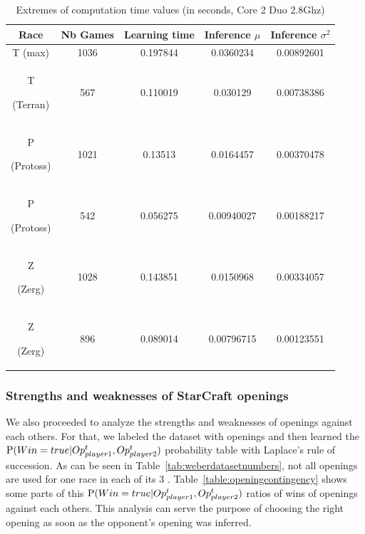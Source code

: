 \begin{table}[h]
\caption{Extremes of computation time values (in seconds, Core 2 Duo 2.8Ghz)}
\begin{center}
\begin{tabular}{|c|cc|cc|}
\hline
Race
& Nb Games
& Learning time
& Inference $\mu$
& Inference $\sigma^2$ \\ \hline
T (max) & 1036 & 0.197844 & 0.0360234 & 0.00892601 \\
T \begin{tiny}(Terran)\end{tiny} & 567 & 0.110019 & 0.030129 & 0.00738386 \\ 
P \begin{tiny}(Protoss)\end{tiny} & 1021 & 0.13513 & 0.0164457 & 0.00370478 \\
P \begin{tiny}(Protoss)\end{tiny} & 542 & 0.056275 & 0.00940027 & 0.00188217 \\ 
Z \begin{tiny}(Zerg)\end{tiny} & 1028 & 0.143851 & 0.0150968 & 0.00334057 \\
Z \begin{tiny}(Zerg)\end{tiny} & 896 & 0.089014 & 0.00796715 & 0.00123551 \\ \hline
\end{tabular}
\label{CPU}
\end{center}
\end{table}

\subsubsection{Strengths and weaknesses of StarCraft openings}

We also proceeded to analyze the strengths and weaknesses of openings against each others. For that, we labeled the dataset with openings and then learned the $\mathrm{P}(Win=true|Op_{player1}^t,Op_{player2}^t)$ probability table with Laplace's rule of succession. As can be seen in Table~\ref{tab:weberdatasetnumbers}, not all openings are used for one race in each of its 3 . Table~\ref{table:openingcontingency} shows some parts of this $\mathrm{P}(Win=true|Op_{player1}^t,Op_{player2}^t)$ ratios of wins of openings against each others. This analysis can serve the purpose of choosing the right opening as soon as the opponent's opening was inferred.


